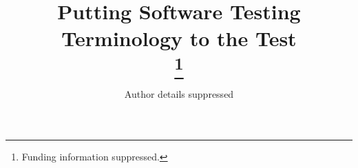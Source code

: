 \documentclass[conference]{IEEEtran}
\begin{document}
\title{Putting Software Testing Terminology to the Test\\
    \thanks{Funding information suppressed.\vspace{4mm}
    }
}

\author{Author details suppressed\vspace{18mm}}




\maketitle
\end{document}
